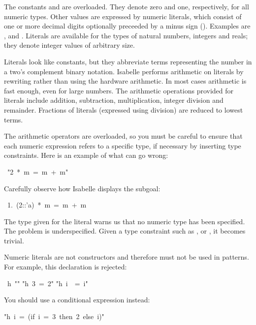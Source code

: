 %
The constants  and  are overloaded.  They denote zero and one,
respectively, for all numeric types.  Other values are expressed by numeric
literals, which consist of one or more decimal digits optionally preceeded by
a minus sign (\isa{-}).  Examples are ,  and
.  Literals are available for the types of natural numbers,
integers and reals; they denote integer values of arbitrary size.

Literals look like constants, but they abbreviate 
terms representing the number in a two's complement binary notation. 
Isabelle performs arithmetic on literals by rewriting rather 
than using the hardware arithmetic. In most cases arithmetic 
is fast enough, even for large numbers. The arithmetic operations 
provided for literals include addition, subtraction, multiplication, 
integer division and remainder.  Fractions of literals (expressed using
division) are reduced to lowest terms.

\begin{warn}
The arithmetic operators are 
overloaded, so you must be careful to ensure that each numeric 
expression refers to a specific type, if necessary by inserting 
type constraints.  Here is an example of what can go wrong:
\par
\begin{isabelle}
\ "2\ *\ m\ =\ m\ +\ m"
\end{isabelle}
%
Carefully observe how Isabelle displays the subgoal:
\begin{isabelle}
\ 1.\ (2::'a)\ *\ m\ =\ m\ +\ m
\end{isabelle}
The type  given for the literal  warns us that no numeric
type has been specified.  The problem is underspecified.  Given a type
constraint such as ,  or , it becomes trivial.
\end{warn}

\begin{warn}
Numeric literals are not constructors and therefore
must not be used in patterns.  For example, this declaration is
rejected:
\begin{isabelle}
\ h\ "\isacharbraceleft \isacharbraceright "\isanewline
"h\ 3\ =\ 2"\isanewline
"h\ i\ \ =\ i"
\end{isabelle}

You should use a conditional expression instead:
\begin{isabelle}
"h\ i\ =\ (if\ i\ =\ 3\ then\ 2\ else\ i)"
\end{isabelle}
\end{warn}



